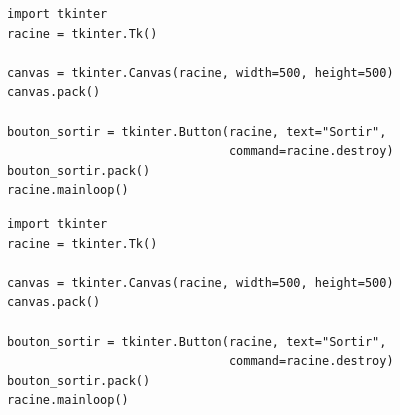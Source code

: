 \begin{Verbatim}[frame=single,rulecolor=\color{mbleu}, label=à taper]
import tkinter
racine = tkinter.Tk()

canvas = tkinter.Canvas(racine, width=500, height=500)
canvas.pack()

bouton_sortir = tkinter.Button(racine, text="Sortir",
                               command=racine.destroy)
bouton_sortir.pack()
racine.mainloop()
\end{Verbatim}

\begin{Verbatim}[frame=single,rulecolor=\color{mbleu}, label=à taper]
import tkinter
racine = tkinter.Tk()

canvas = tkinter.Canvas(racine, width=500, height=500)
canvas.pack()

bouton_sortir = tkinter.Button(racine, text="Sortir",
                               command=racine.destroy)
bouton_sortir.pack()
racine.mainloop()
\end{Verbatim}

